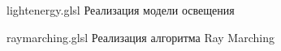 \begin{appendices}
	
	{lightenergy.glsl} %
	{} %
	{Реализация модели освещения} %
	
	
	{raymarching.glsl} %
	{} %
	{Реализация алгоритма Ray Marching} %
	
\end{appendices}